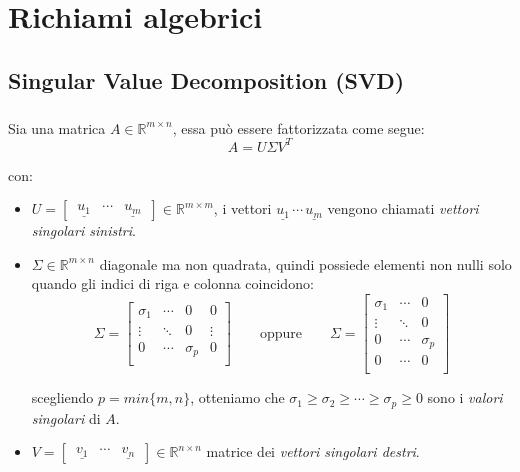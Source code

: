 \chapter{Richiami algebrici}
\section{Singular Value Decomposition (SVD)}
\paragraph{}
Sia una matrica $A\in\mathbb{R}^{m\times n}$, essa può essere fattorizzata come segue:
\begin{equation}
	A = U \Sigma V^T
\end{equation}

con:
\begin{itemize}
	\item $U = 
	\begin{bmatrix}
		\,\underline{u_1} & \cdots & \underline{u_m}\,
	\end{bmatrix} 
	\in\mathbb{R}^{m \times m}$, i vettori $\underline{u_1}\,\cdots\,\underline{u_m}$ vengono chiamati \emph{vettori singolari sinistri}.
	\item $\Sigma\in\mathbb{R}^{m \times n}$ diagonale ma non quadrata, quindi possiede elementi non nulli solo quando gli indici di riga e colonna coincidono:
	\begin{equation*}
		\Sigma = 
		\begin{bmatrix}
			\sigma_1 & \cdots & 0 & 0 \\
			\vdots & \ddots & 0 & \vdots \\
			0 & \cdots & \sigma_p & 0 \\
		\end{bmatrix}
		\qquad \text{oppure} \qquad
		\Sigma = 
		\begin{bmatrix}
			\sigma_1 & \cdots & 0 \\
			\vdots & \ddots & 0 \\
			0 & \cdots & \sigma_p \\
			0 & \cdots & 0 \\
		\end{bmatrix}
	\end{equation*}
	
	scegliendo $p = min \lbrace m,n \rbrace$, otteniamo che $\sigma_1 \geqslant \sigma_2 \geqslant \cdots \geqslant \sigma_p \geqslant 0$ sono i \emph{valori singolari} di $A$.
	\item $V = 
	\begin{bmatrix}
		\,\underline{v_1} & \cdots & \underline{v_n}\,
	\end{bmatrix} \in\mathbb{R}^{n \times n}$ matrice dei \emph{vettori singolari destri}.
\end{itemize}

